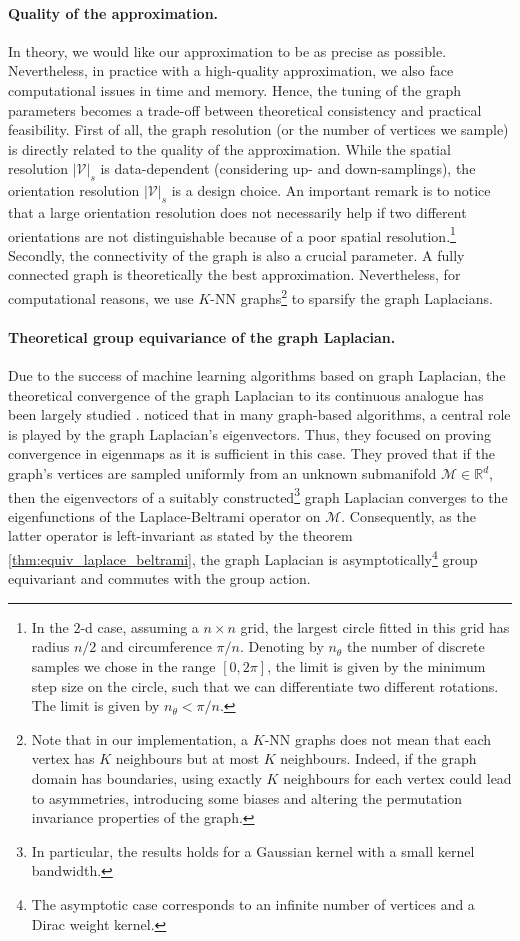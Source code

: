 \documentclass{article}
\begin{document}
\paragraph{Quality of the approximation.} In theory, we would like our approximation to be as precise as possible. Nevertheless, in practice with a high-quality approximation, we also face computational issues in time and memory. Hence, the tuning of the graph parameters becomes a trade-off between theoretical consistency and practical feasibility. First of all, the graph resolution (or the number of vertices we sample) is directly related to the quality of the approximation. While the spatial resolution $|\mathcal{V}|_s$ is data-dependent (considering up- and down-samplings), the orientation resolution $|\mathcal{V}|_s$ is a design choice. An important remark is to notice that a large orientation resolution does not necessarily help if two different orientations are not distinguishable because of a poor spatial resolution.\footnote{In the $2$-d case, assuming a $n \times n$ grid, the largest circle fitted in this grid has radius $n/2$ and circumference $\pi/n$. Denoting by $n_\theta$ the number of discrete samples we chose in the range $[0, 2\pi]$, the limit is given by the minimum step size on the circle, such that we can differentiate two different rotations. The limit is given by $n_\theta < \pi / n$.} Secondly, the connectivity of the graph is also a crucial parameter. A fully connected graph is theoretically the best approximation. Nevertheless, for computational reasons, we use $K$-NN graphs\footnote{Note that in our implementation, a $K$-NN graphs does not mean that each vertex has $K$ neighbours but at most $K$ neighbours. Indeed, if the graph domain has boundaries, using exactly $K$ neighbours for each vertex could lead to asymmetries, introducing some biases and altering the permutation invariance properties of the graph.} to sparsify the graph Laplacians.

\paragraph{Theoretical group equivariance of the graph Laplacian.} Due to the success of machine learning algorithms based on graph Laplacian, the theoretical convergence of the graph Laplacian to its continuous analogue has been largely studied \citep{hein2005graphs, singer2006graph}. \cite{belkin2006convergence} noticed that in many graph-based algorithms, a central role is played by the graph Laplacian's eigenvectors. Thus, they focused on proving convergence in eigenmaps as it is sufficient in this case. They proved that if the graph's vertices are sampled uniformly from an unknown submanifold $\mathcal{M} \in \mathbb{R}^d$, then the eigenvectors of a suitably constructed\footnote{In particular, the results holds for a Gaussian kernel with a small kernel bandwidth.} graph Laplacian converges to the eigenfunctions of the Laplace-Beltrami operator on $\mathcal{M}$. Consequently, as the latter operator is left-invariant as stated by the theorem \ref{thm:equiv_laplace_beltrami}, the graph Laplacian is asymptotically\footnote{The asymptotic case corresponds to an infinite number of vertices and a Dirac weight kernel.} group equivariant and commutes with the group action.
\end{document}
